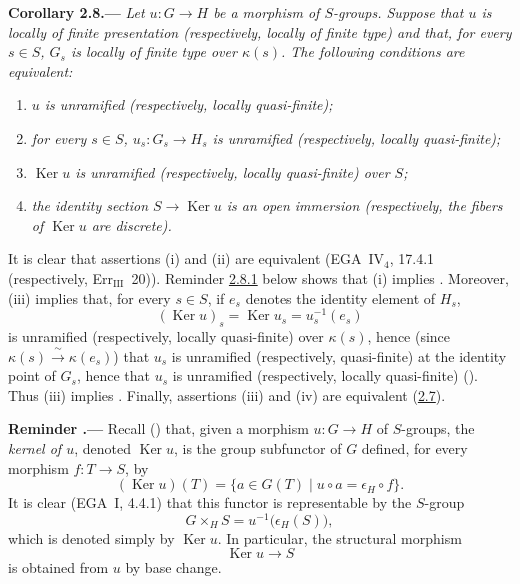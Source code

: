
\medskip
{}\label{cor:sga3-VIB-2.8}%
\noindent\textbf{Corollary 2.8.---}
\emph{Let \(u:G\to H\) be a morphism of \(S\)-groups. Suppose that \(u\)
is locally of finite presentation (respectively, locally of finite type)
and that, for every \(s\in S\), \(G_s\) is locally of finite type over
\(\kappa(s)\). The following conditions are equivalent:}
\begin{enumerate}
\item[\textup{(i)}] \emph{\(u\) is unramified (respectively, locally
  quasi-finite);}
\item[\textup{\SGAInlineRefTarget{cor:sga3-VIB-2.8:item:ii}(ii)}] \emph{for every \(s\in S\),
  \(u_s:G_s\to H_s\) is unramified (respectively, locally
  quasi-finite);}
\item[\textup{\SGAInlineRefTarget{cor:sga3-VIB-2.8:item:iii}(iii)}] \emph{\(\operatorname{Ker}u\) is unramified
  (respectively, locally quasi-finite) over \(S\);}
\item[\textup{(iv)}] \emph{the identity section
  \(S\to\operatorname{Ker}u\) is an open immersion (respectively, the
  fibers of \(\operatorname{Ker}u\) are discrete).}
\end{enumerate}

It is clear that assertions \textup{(i)} and \textup{(ii)} are equivalent
(EGA~IV\(_4\), 17.4.1 (respectively, Err\(_{\mathrm{III}}\)~20)). Reminder
\hyperref[rem:sga3-VIB-2.8.1]{2.8.1} below shows that \textup{(i)} implies
\textup{}. Moreover, \textup{(iii)} implies that, for every \(s\in S\),
if \(e_s\) denotes the identity element of \(H_s\),
\[
  (\operatorname{Ker}u)_s
    =\operatorname{Ker}u_s
    =u_s^{-1}(e_s)
\]
is unramified (respectively, locally quasi-finite) over \(\kappa(s)\),
hence (since \(\kappa(s)\xrightarrow{\ \sim\ }\kappa(e_s)\)) that \(u_s\) is
unramified (respectively, quasi-finite) at the identity point of \(G_s\),
hence that \(u_s\) is unramified (respectively, locally quasi-finite)
(). Thus \textup{(iii)} implies \textup{}. Finally, assertions
\textup{(iii)} and \textup{(iv)} are equivalent (\hyperref[prop:sga3-VIB-2.7]{2.7}).

\medskip
{}\label{rem:sga3-VIB-2.8.1}%
\noindent\textbf{Reminder .---}
Recall () that, given a morphism
\(u:G\to H\) of \(S\)-groups, the \emph{kernel of \(u\)}, denoted
\(\operatorname{Ker}u\), is the group subfunctor of \(G\) defined,
for every morphism \(f:T\to S\), by
\[
  (\operatorname{Ker}u)(T)
    =\{a\in G(T)\mid u\circ a=\epsilon_H\circ f\}.
\]
It is clear (EGA~I, 4.4.1) that this functor is representable by
the \(S\)-group
\[
  G\times_H S=u^{-1}\bigl(\epsilon_H(S)\bigr),
\]
which is denoted simply by \(\operatorname{Ker}u\). In particular,
the structural morphism
\[
  \operatorname{Ker}u\longrightarrow S
\]
is obtained from \(u\) by base change.

